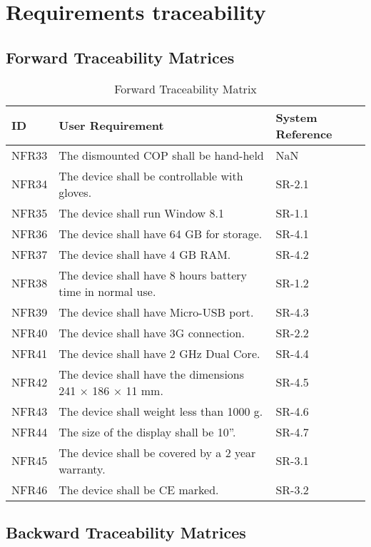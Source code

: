 \documentclass[Main]{subfiles}
\begin{document}
\chapter{Requirements traceability}
\section{Forward Traceability Matrices}
\begin{table}[htbp]
	\centering
	\begin{tabular}{l p{10cm} l} \hline
	ID & User Requirement & System Reference \\\hline
	
	NFR33 & The dismounted COP shall be hand-held & NaN \\
	NFR34 & The device shall be controllable with gloves. & SR-2.1 \\
	NFR35 & The device shall run Window 8.1 & SR-1.1 \\
	NFR36 & The device shall have 64 GB for storage.  & SR-4.1 \\
	NFR37 & The device shall have 4 GB RAM.  & SR-4.2 \\
	NFR38 & The device shall have 8 hours battery time in normal use. & SR-1.2 \\
	NFR39 & The device shall have Micro-USB port. & SR-4.3 \\
	NFR40 & The device shall have 3G connection.  & SR-2.2 \\
	NFR41 & The device shall have 2 GHz Dual Core.  & SR-4.4 \\
	NFR42 & The device shall have the dimensions 241 × 186 × 11 mm.  & SR-4.5 \\
	NFR43 & The device shall weight less than 1000 g.  & SR-4.6 \\
	NFR44 & The size of the display shall be 10”.  & SR-4.7 \\
	NFR45 & The device shall be covered by a 2 year warranty.  & SR-3.1 \\
	NFR46 & The device shall be CE marked. & SR-3.2 \\\hline
	\end{tabular}
\caption{Forward Traceability Matrix}
\label{Tab:ForwardTraceability}
\end{table}

\newpage
\section{Backward Traceability Matrices}
\end{document}
